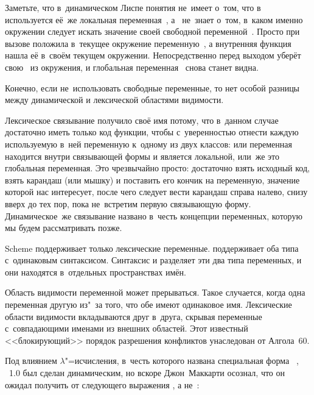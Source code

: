 Заметьте, что в~динамическом Лиспе  понятия не~имеет о~том, что
в~ используется её~же локальная переменная~, а~ не~знает
о~том, в~каком именно окружении следует искать значение своей свободной
переменной~. Просто  при вызове положила в~текущее окружение
переменную~, а внутренняя функция  нашла её в~своём
текущем окружении. Непосредственно перед выходом  уберёт свою~ из
окружения, и глобальная переменная~ снова станет видна.

Конечно, если не~использовать свободные переменные, то нет особой разницы между
динамической и лексической областями видимости.

Лексическое связывание получило своё имя потому, что в~данном случае достаточно
иметь только код функции, чтобы с~уверенностью отнести каждую используемую в~ней
переменную к~одному из двух классов: или переменная находится внутри связывающей
формы и является локальной, или~же это глобальная переменная. Это чрезвычайно
просто: достаточно взять исходный код, взять карандаш (или мышку) и поставить
его кончик на переменную, значение которой нас интересует, после чего следует
вести карандаш справа налево, снизу вверх до тех пор, пока не~встретим первую
связывающую форму. Динамическое~же связывание названо в~честь концепции
 переменных, которую мы будем рассматривать
позже. 

Scheme поддерживает только лексические переменные. {\CommonLisp} поддерживает
оба типа с~одинаковым синтаксисом. Синтаксис {\EuLisp} и {\ISLisp} разделяет эти
два типа переменных, и они находятся в~отдельных пространствах имён.

Область видимости переменной может прерываться. Такое случается, когда одна
переменная  другую из"~за того, что обе имеют одинаковое имя.
Лексические области видимости вкладываются друг в~друга, скрывая переменные
с~совпадающими именами из внешних областей. Этот известный <<блокирующий>>
порядок разрешения конфликтов унаследован от Алгола~60.

Под влиянием $\lambda$"=исчисления, в~честь которого названа специальная
форма ~\cite{per79}, \LISP~1.0 был сделан динамическим, но вскоре
Джон~Маккарти осознал, что он ожидал получить от следующего выражения
, а не~:


